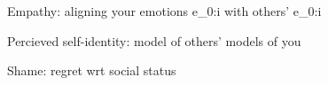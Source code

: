 Empathy: aligning your emotions e_{0:i} with others' e_{0:i}

Percieved self-identity: model of others' models of you

Shame: regret wrt social status
